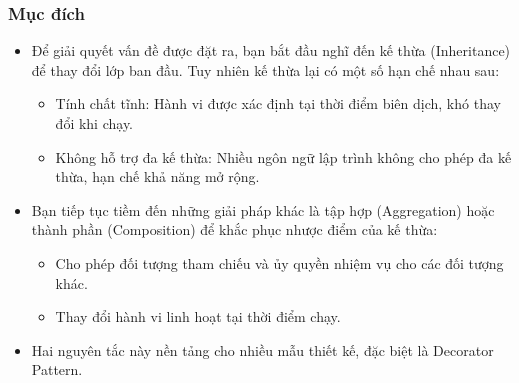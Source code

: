 \subsubsection{Mục đích}
\begin{itemize}
    \item Để giải quyết vấn đề được đặt ra, bạn bắt đầu nghĩ đến kế thừa (Inheritance) để thay đổi lớp ban đầu. Tuy nhiên kế thừa lại có một số hạn chế nhau sau:
          \begin{itemize}
              \item Tính chất tĩnh: Hành vi được xác định tại thời điểm biên dịch, khó thay đổi khi chạy.
              \item Không hỗ trợ đa kế thừa: Nhiều ngôn ngữ lập trình không cho phép đa kế thừa, hạn chế khả năng mở rộng.
          \end{itemize}

    \item Bạn tiếp tục tiềm đến những giải pháp khác là tập hợp (Aggregation) hoặc thành phần (Composition) để khắc phục nhược điểm của kế thừa:
          \begin{itemize}
              \item Cho phép đối tượng tham chiếu và ủy quyền nhiệm vụ cho các đối tượng khác.
              \item Thay đổi hành vi linh hoạt tại thời điểm chạy.
          \end{itemize}
    \item Hai nguyên tắc này nền tảng cho nhiều mẫu thiết kế, đặc biệt là Decorator Pattern.
\end{itemize}

